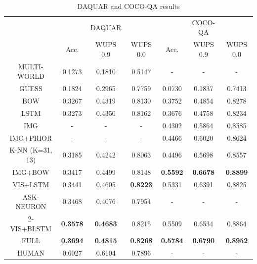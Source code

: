 \documentclass{article} %
\renewcommand{\#}[1]{\textbf{#1}}
\begin{document}
\begin{table}[h]
\caption{DAQUAR and COCO-QA results}
\label{tab:daquar_results}
\begin{center}
\begin{small}
\begin{sc}
\begin{tabular}{c | c c c | c c c}
\hline     
                     &          &  DAQUAR  &          &          &  COCO-QA &          \\
                     & Acc.     & WUPS 0.9 & WUPS 0.0 & Acc.     & WUPS 0.9 & WUPS 0.0 \\
\hline         
MULTI-WORLD
\cite{malinowski14b} &  0.1273  &  0.1810  &  0.5147  &  -       &  -       &  -       \\
GUESS                &  0.1824  &  0.2965  &  0.7759  &  0.0730  &  0.1837  &  0.7413  \\
BOW                  &  0.3267  &  0.4319  &  0.8130  &  0.3752  &  0.4854  &  0.8278  \\
LSTM                 &  0.3273  &  0.4350  &  0.8162  &  0.3676  &  0.4758  &  0.8234  \\
IMG                  &  -       &  -       &  -       &  0.4302  &  0.5864  &  0.8585  \\
IMG+PRIOR            &  -       &  -       &  -       &  0.4466  &  0.6020  &  0.8624  \\
K-NN (K=31, 13)      &  0.3185  &  0.4242  &  0.8063  &  0.4496  &  0.5698  &  0.8557  \\
IMG+BOW              &  0.3417  &  0.4499  &  0.8148  &\#{0.5592}&\#{0.6678}&\#{0.8899}\\
VIS+LSTM             &  0.3441  &  0.4605  &\#{0.8223}&  0.5331  &  0.6391  & 0.8825   \\
ASK-NEURON
\cite{malinowski15}  &  0.3468  &  0.4076  & 0.7954   &  -       &  -       &  -       \\
2-VIS+BLSTM          &\#{0.3578}&\#{0.4683}& 0.8215   &  0.5509  &  0.6534  & 0.8864   \\
FULL                 &\#{0.3694}&\#{0.4815}&\#{0.8268}&\#{0.5784}&\#{0.6790}&\#{0.8952}\\
\hline
HUMAN                &  0.6027  &  0.6104  &  0.7896  &  -       &  -       &  -       \\
\hline
\end{tabular}
\end{sc}
\end{small}
\end{center}
\end{table}
\end{document}

